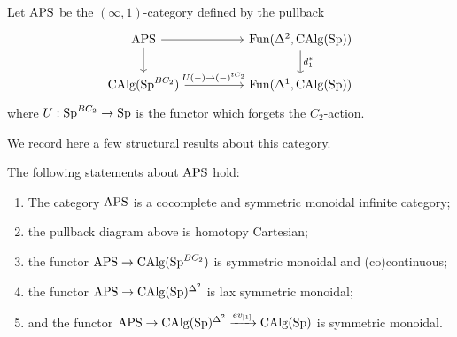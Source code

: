 \begin{definition}
Let $\mathrm{APS}$ be the $(\infty,1)$-category defined by the pullback \[
\begin{tikzcd}
\aps \arrow[rr]\arrow[d] & & \operatorname{Fun}(\Delta^2, \CAlg(\Sp))\arrow[d,"d_1^*"]\\
\CAlg(\Sp^{BC_2})\arrow[rr,"U(-)\to (-)^{tC_2}"] & & \operatorname{Fun}(\Delta^1, \CAlg(\Sp))
\end{tikzcd}
\] where $U:\operatorname{Sp}^{BC_2}\to \operatorname{Sp}$ is the functor which forgets the $C_2$-action.
\end{definition}

We record here a few structural results about this category.

\begin{theorem}
The following statements about $\mathrm{APS}$ hold:
\begin{enumerate}
\item The category $\mathrm{APS}$ is a cocomplete and symmetric monoidal infinite category;
\item the pullback diagram above is homotopy Cartesian;
\item the functor $\mathrm{APS}\to \operatorname{CAlg}(\operatorname{Sp}^{BC_2})$ is symmetric monoidal and (co)continuous;
\item the functor $\mathrm{APS}\to \operatorname{CAlg}(\operatorname{Sp})^{\Delta^2}$ is lax symmetric monoidal;
\item and the functor $\mathrm{APS}\to \operatorname{CAlg}(\operatorname{Sp})^{\Delta^2}\xrightarrow{ev_{[1]}} \operatorname{CAlg}(\operatorname{Sp})$ is symmetric monoidal.
\end{enumerate}
\end{theorem}
